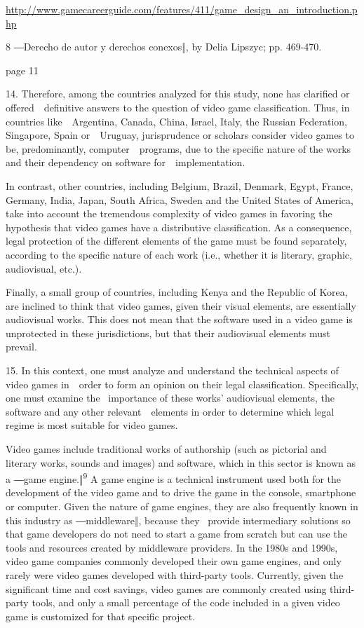 \documentclass[
]{article}
\begin{document}
\href{http://www.gamecareerguide.com/features/411/game_design_an_introduction.php}{{http://www.gamecareerguide.com/features/411/game\_design\_an\_introduction.php}}

{8 }{―Derecho de autor y derechos conexos‖, by Delia Lipszyc; pp.
}{469-470.}

{page 11}

{14. }{Therefore, among the countries analyzed for this study, none has
clarified or offered~~definitive answers to the question of video game
classification. Thus, in countries like~~Argentina, Canada, China,
Israel, Italy, the Russian Federation, Singapore, Spain or~~Uruguay,
jurisprudence or scholars consider video games to be, predominantly,
computer~~programs, due to the specific nature of the works and their
dependency on software for~~implementation.}

{In contrast, other countries, including Belgium, Brazil, Denmark,
Egypt, France, Germany, India, Japan, South Africa, Sweden and the
United States of America, take into account the tremendous complexity of
video games in favoring the hypothesis that video games have a
distributive classification. As a consequence, legal protection of the
different elements of the game must be found separately, according to
the specific nature of each work (i.e., whether it is literary, graphic,
audiovisual, etc.).}

{Finally, a small group of countries, including Kenya and the Republic
of Korea, are inclined to think that video games, given their visual
elements, are essentially audiovisual works. This does not mean that the
software used in a video game is unprotected in these jurisdictions, but
that their audiovisual elements must prevail.}

{15. }{In this context, one must analyze and understand the technical
aspects of video games in~~order to form an opinion on their legal
classification. Specifically, one must examine the }{~importance of
these works' audiov}{isual elements, the software and any other
relevant~~elements in order to determine which legal regime is most
suitable for video games.}

{Video games include traditional works of authorship (such as pictorial
and literary works, sounds and images) and softw}{are, which in this
sector is known as a ―}{game engine.‖}\textsuperscript{{9 }}{A game
engine is a technical instrument used both for the development of the
video game and to drive the game in the console, }{smartphone }{or
computer. Given the nature of game engines, they are also }{frequently
known in this industry as ―}{middleware}{‖, because they }{~provide
intermediary solutions so that game developers do not need to start a
game from scratch but can use the tools and resources created by
middleware providers. In the 1980s and 1990s, video game companies
commonly developed their own game engines, and only rarely were video
games developed with third-party tools. Currently, given the significant
time and cost savings, video games are commonly created using
third-party tools, and only a small percentage of the code included in a
given video game is customized for that specific project.}
\end{document}
